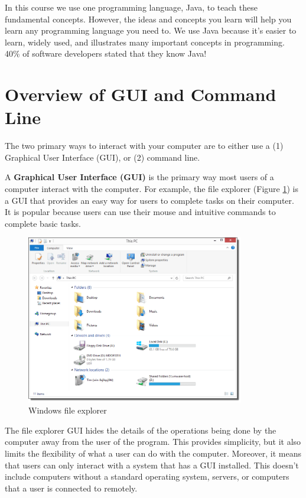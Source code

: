In this course we use one programming language, Java, to teach these fundamental concepts.
However, the ideas and concepts you learn will help you learn any programming language you need to. 
We use Java because it’s easier to learn, widely used, and illustrates many important concepts in programming. 40\% of software developers stated that they know Java! \\

\section{Overview of GUI and Command Line}

The two primary ways to interact with your computer are to either use a (1) Graphical User Interface (GUI), or (2) command line.

A \textbf{Graphical User Interface (GUI)} is the primary way most users of a computer interact with the computer. For example, the file explorer (Figure \ref{fig:windows:file}) is a GUI that provides an easy way for users to complete tasks on their computer. It is popular because users can use their mouse and intuitive commands to complete basic tasks. \\

\begin{figure}
	\centering
	\includegraphics[width=0.85\textwidth]{images/windowsGUI.png}
	\caption{Windows file explorer}
	\label{fig:windows:file}
\end{figure}

The file explorer GUI hides the details of the operations being done by the computer away from the user of the program. This provides simplicity, but it also limits the flexibility of what a user can do with the computer. Moreover, it means that users can only interact with a system that has a GUI installed. This doesn’t include computers without a standard operating system, servers, or computers that a user is connected to remotely. \\

